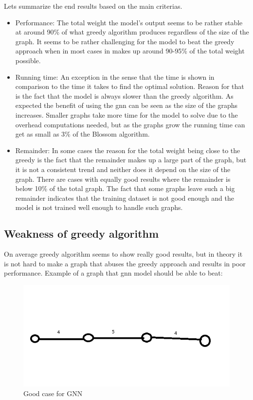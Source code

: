 Lets summarize the end results based on the main criterias.
\begin{itemize}
\item Performance: The total weight the model's output seems to be rather stable at around 90\% of what greedy algorithm produces regardless of the size of the graph. It seems to be rather challenging for the model to beat the greedy approach when in most cases in makes up around 90-95\% of the total weight possible.
\item Running time: An exception in the sense that the time is shown in comparison to the time it takes to find the optimal solution. Reason for that is the fact that the model is always slower than the greedy algorithm. As expected the benefit of using the \gls{gnn} can be seen as the size of the graphs increases. Smaller graphs take more time for the model to solve due to the overhead computations needed, but as the graphs grow the running time can get as small as 3\% of the Blossom algorithm.
\item Remainder: In some cases the reason for the total weight being close to the greedy is the fact that the remainder makes up a large part of the graph, but it is not a consistent trend and neither does it depend on the size of the graph. There are cases with equally good results where the remainder is below 10\% of the total graph. The fact that some graphs leave such a big remainder indicates that the training dataset is not good enough and the model is not trained well enough to handle such graphs.
\end{itemize}

\subsection{Weakness of greedy algorithm}

On average greedy algorithm seems to show really good results, but in theory it is not hard to make a graph that abuses the greedy approach and results in poor performance. Example of a graph that \gls{gnn} model should be able to beat:

\begin{figure}[H]
    \centering
    \includegraphics[scale=1.0]{figures/GoodCase}
    \caption{Good case for GNN}
    \label{Good case for GNN}
\end{figure}

